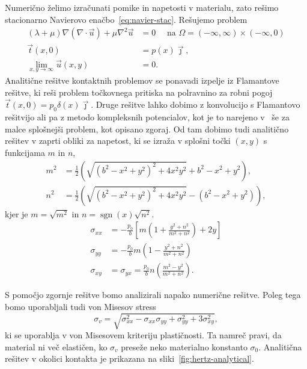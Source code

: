 \documentclass[12pt,a4paper,twoside]{article}
\theoremstyle{definition} %
\theoremstyle{plain} %
\numberwithin{equation}{section}
\newcommand{\vt}{\vec{t}}
\newcommand{\vu}{\vec{u}}
\newcommand{\vj}{\vec{\jmath}}
\DeclareMathOperator{\sgn}{sgn}
\begin{document}
Numerično želimo izračunati pomike in napetosti v materialu, zato rešimo stacionarno Navierovo
enačbo~\eqref{eq:navier-stac}. Rešujemo problem
\begin{align}
  (\lambda + \mu) \nabla(\nabla\cdot \vu) + \mu \nabla^2 \vu &= 0 \quad \text{ na } \Omega =
  (-\infty, \infty) \times (-\infty, 0)   \label{eq:hertzian-problem} \\
  \vt(x, 0) &= p(x)\vj, \nonumber \\
  \lim_{x, y\to\infty} \vu(x, y) &= 0. \nonumber
\end{align}
Analitične rešitve kontaktnih problemov se ponavadi izpelje iz Flamantove rešitve, ki reši problem
točkovnega pritiska na polravnino za robni pogoj $\vt(x, 0) = p_0\delta(x)\vj$. Druge rešitve lahko
dobimo z konvolucijo s Flamantovo rešitvijo ali pa z metodo kompleksnih potencialov, kot je to
narejeno v~\cite{mcewen1949stresses} še za malce splošnejši problem, kot opisano zgoraj.
Od tam dobimo tudi analitično rešitev v zaprti obliki za napetost, ki se izraža v splošni točki $(x,
y)$ s funkcijama $m$ in $n$,
\begin{align*}
  m^2 &= \frac{1}{2} \left(\sqrt{\left(b^2-x^2+y^2\right)^2+4 x^2 y^2}+b^2-x^2+y^2\right), \\
  n^2 &= \frac{1}{2} \left(\sqrt{\left(b^2-x^2+y^2\right)^2+4 x^2 y^2}-(b^2-x^2+y^2)\right),
\end{align*}
kjer je $m=\sqrt{m^2}$ in $n=\sgn(x)\sqrt{n^2}$.
\begin{align*}
  \sigma_{xx} &= -\frac{p_0}{b}\left[m\left(1 + \frac{y^2 + n^2}{m^2 + n^2}\right)+2y\right] \\
  \sigma_{yy} &= -\frac{p_0}{b}m\left(1 - \frac{y^2 + n^2}{m^2 + n^2}\right) \\
  \sigma_{xy} &= \sigma_{yx} = \frac{p_0}{b}n\left(\frac{m^2 - y^2}{m^2 + n^2}\right).
\end{align*}

S pomočjo zgornje rešitve bomo analizirali napako numerične rešitve. Poleg tega bomo uporabljali
tudi von Misesov stress
\[
  \sigma_v = \sqrt{\sigma_{xx}^2-\sigma_{xx}\sigma_{yy}+\sigma_{yy}^2+3\sigma_{xy}^2},
\]
ki se uporablja v von Misesovem kriteriju plastičnosti. Ta namreč pravi, da material ni več
elastičen, ko $\sigma_v$ preseže neko materialno konstanto $\sigma_0$. Analitična rešitev v okolici
kontakta je prikazana na sliki~\ref{fig:hertz-analytical}.
\end{document}
